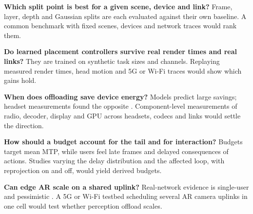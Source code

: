 \begin{openproblems}
\item \textbf{Which split point is best for a given scene, device and link?} Frame, layer, depth and
  Gaussian splits are each evaluated against their own baseline. A common benchmark with fixed scenes,
  devices and network traces would rank them.
\item \textbf{Do learned placement controllers survive real render times and real links?} They are
  trained on synthetic task sizes and channels. Replaying measured render times, head motion and 5G or
  Wi-Fi traces would show which gains hold.
\item \textbf{When does offloading save device energy?} Models predict large savings; headset
  measurements found the opposite \cite{W4362489903,W4387913063}. Component-level measurements of radio,
  decoder, display and GPU across headsets, codecs and links would settle the direction.
\item \textbf{How should a budget account for the tail and for interaction?} Budgets target mean MTP,
  while users feel late frames and delayed consequences of actions. Studies varying the delay distribution
  and the affected loop, with reprojection on and off, would yield derived budgets.
\item \textbf{Can edge AR scale on a shared uplink?} Real-network evidence is single-user and
  pessimistic \cite{W4390905995,W3047439371}. A 5G or Wi-Fi testbed scheduling several AR camera uplinks
  in one cell would test whether perception offload scales.
\end{openproblems}

